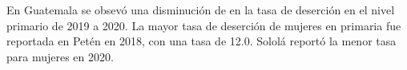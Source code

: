 En Guatemala se obsevó una disminución de en la tasa de deserción en el nivel primario de 2019 a 2020. La mayor tasa de deserción de mujeres en primaria fue reportada en Petén en 2018, con una tasa de 12.0. Sololá reportó la menor tasa para mujeres en 2020. 